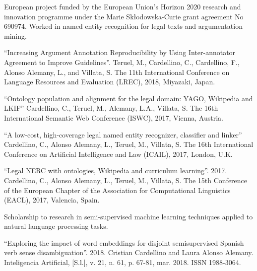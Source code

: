 \documentclass[]{deedy-resume-openfont}
\begin{document}
European project funded by the European Union's Horizon 2020 research and 
innovation programme under the Marie Sk\l{}odowska-Curie grant agreement No 
690974. Worked in named entity recognition for legal texts and argumentation
mining.
\begin{tightemize}
\item ``Increasing Argument Annotation Reproducibility by Using Inter-annotator
Agreement to Improve Guidelines''. Teruel, M., Cardellino, C., 
Cardellino, F., Alonso Alemany, L., and Villata, S. The 11th International 
Conference on Language Resources and Evaluation (LREC), 2018, Miyazaki, Japan.
\item ``Ontology population and alignment for the legal domain: YAGO, Wikipedia and LKIF''
Cardellino, C., Teruel, M., Alemany, L.A., Villata, S. The 16th International
Semantic Web Conference (ISWC), 2017, Vienna, Austria.
\item ``A low-cost, high-coverage legal named entity recognizer, classifier and linker''
Cardellino, C., Alonso Alemany, L., Teruel, M., Villata, S. The 16th International 
Conference on Artificial Intelligence and Law (ICAIL), 2017, London, U.K.
\item ``Legal NERC with ontologies, Wikipedia and curriculum learning''. 2017.
Cardellino, C., Alonso Alemany, L., Teruel, M., Villata, S. The 15th Conference of the 
European Chapter of the Association for Computational Linguistics (EACL), 2017,
Valencia, Spain.
\end{tightemize}
\sectionsep

Scholarship to research in semi-supervised machine learning techniques applied
to natural language processing tasks.
\begin{tightemize}
\item ``Exploring the impact of word embeddings for disjoint semisupervised Spanish verb 
sense disambiguation''. 2018. Cristian Cardellino and Laura Alonso Alemany.
Inteligencia Artificial, [S.l.], v. 21, n. 61, p. 67-81, mar. 2018. ISSN 1988-3064.
\end{tightemize}
\sectionsep

\sectionsep
\end{document}
